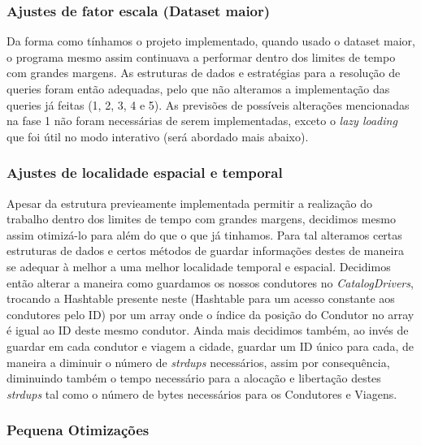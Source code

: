 \documentclass{article}
\begin{document}
        \subsubsection{Ajustes de fator escala (Dataset maior)}
            Da forma como tínhamos o projeto implementado, quando 
            usado o dataset maior, o programa mesmo assim continuava
            a performar dentro dos limites de tempo com grandes 
            margens. As estruturas de dados e estratégias para
            a resolução de queries foram então adequadas, pelo que
            não alteramos a implementação das queries já feitas
            (1, 2, 3, 4 e 5). As previsões de possíveis alterações
            mencionadas na fase 1 não foram necessárias de serem
            implementadas, exceto o \emph{lazy loading} que foi
            útil no modo interativo (será abordado mais abaixo).

        \subsubsection{Ajustes de localidade espacial e temporal}
            Apesar da estrutura previeamente implementada permitir a realização
            do trabalho dentro dos limites de tempo com grandes margens, decidimos
            mesmo assim otimizá-lo para além do que o que já tinhamos. Para tal
            alteramos certas estruturas de dados e certos métodos de guardar 
            informações destes de maneira se adequar à melhor a uma melhor localidade 
            temporal e espacial. Decidimos então alterar a maneira como guardamos os 
            nossos condutores no \emph{CatalogDrivers}, trocando a Hashtable presente
            neste (Hashtable para um acesso constante aos condutores pelo ID) por um 
            array onde o índice da posição do Condutor no array é igual ao ID deste 
            mesmo condutor. Ainda mais decidimos também, ao invés de guardar em cada 
            condutor e viagem a cidade, guardar um ID único para cada, de maneira a 
            diminuir o número de \emph{strdups} necessários, assim por consequência, 
            diminuindo também o tempo necessário para a alocação e libertação destes 
            \emph{strdups} tal como o número de bytes necessários para os Condutores e
            Viagens.

        \subsubsection{Pequena Otimizações}
            
\end{document}
